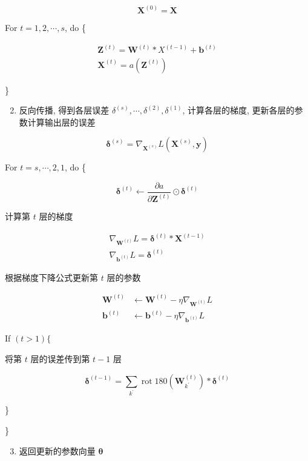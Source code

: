 \documentclass[10pt]{article}
\begin{document}
$$
\boldsymbol{X}^{(0)}=\boldsymbol{X}
$$

For $t=1,2, \cdots, s$, do \{

$$
\begin{gathered}
\boldsymbol{Z}^{(t)}=\boldsymbol{W}^{(t)} * X^{(t-1)}+\boldsymbol{b}^{(t)} \\
\boldsymbol{X}^{(t)}=a\left(\boldsymbol{Z}^{(t)}\right)
\end{gathered}
$$

\}

\begin{enumerate}
  \setcounter{enumi}{1}
  \item 反向传播, 得到各层误差 $\delta^{(s)}, \cdots, \delta^{(2)}, \delta^{(1)}$, 计算各层的梯度, 更新各层的参数计算输出层的误差
\end{enumerate}

$$
\boldsymbol{\delta}^{(s)}=\nabla_{\boldsymbol{X}^{(s)}} L\left(\boldsymbol{X}^{(s)}, \boldsymbol{y}\right)
$$

For $t=s, \cdots, 2,1$, do \{

$$
\boldsymbol{\delta}^{(t)} \leftarrow \frac{\partial a}{\partial \boldsymbol{Z}^{(t)}} \odot \boldsymbol{\delta}^{(t)}
$$

计算第 $t$ 层的梯度

$$
\begin{gathered}
\nabla_{\boldsymbol{W}^{(t)}} L=\boldsymbol{\delta}^{(t)} * \boldsymbol{X}^{(t-1)} \\
\nabla_{\boldsymbol{b}^{(t)}} L=\boldsymbol{\delta}^{(t)}
\end{gathered}
$$

根据梯度下降公式更新第 $t$ 层的参数

$$
\begin{aligned}
\boldsymbol{W}^{(t)} & \leftarrow \boldsymbol{W}^{(t)}-\eta \nabla_{\boldsymbol{W}^{(t)}} L \\
\boldsymbol{b}^{(t)} & \leftarrow \boldsymbol{b}^{(t)}-\eta \nabla_{\boldsymbol{b}^{(t)}} L
\end{aligned}
$$

If $(t>1)\{$

将第 $t$ 层的误差传到第 $t-1$ 层

$$
\boldsymbol{\delta}^{(t-1)}=\sum_{k^{\prime}} \operatorname{rot} 180\left(\boldsymbol{W}_{k^{\prime}}^{(t)}\right) * \boldsymbol{\delta}^{(t)}
$$

\}

\}

\begin{enumerate}
  \setcounter{enumi}{2}
  \item 返回更新的参数向量 $\boldsymbol{\theta}$
\end{enumerate}
\end{document}
